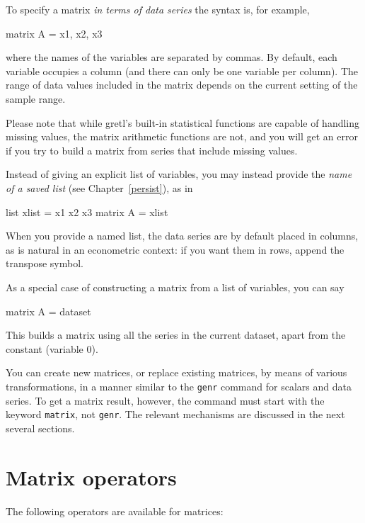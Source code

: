 To specify a matrix \textit{in terms of data series} the syntax is,
for example,
%
\begin{code}
matrix A = { x1, x2, x3 }
\end{code}
%
where the names of the variables are separated by commas.  By default,
each variable occupies a column (and there can only be one variable
per column).  The range of data values included in the matrix depends
on the current setting of the sample range.

Please note that while gretl's built-in statistical functions are
capable of handling missing values, the matrix arithmetic functions
are not, and you will get an error if you try to build a matrix from
series that include missing values.

Instead of giving an explicit list of variables, you may instead
provide the \textit{name of a saved list} (see Chapter~\ref{persist}),
as in
%
\begin{code}
list xlist = x1 x2 x3
matrix A = { xlist }
\end{code}
%
When you provide a named list, the data series are by default placed
in columns, as is natural in an econometric context: if you want them
in rows, append the transpose symbol.

As a special case of constructing a matrix from a list of variables,
you can say
%
\begin{code}
matrix A = { dataset }
\end{code}
%
This builds a matrix using all the series in the current dataset,
apart from the constant (variable 0).

You can create new matrices, or replace existing matrices, by means of
various transformations, in a manner similar to the \texttt{genr}
command for scalars and data series.  To get a matrix result, however,
the command must start with the keyword \texttt{matrix}, not
\texttt{genr}.  The relevant mechanisms are discussed in the next
several sections.


\section{Matrix operators}
\label{matrix-op}

The following operators are available for matrices:

